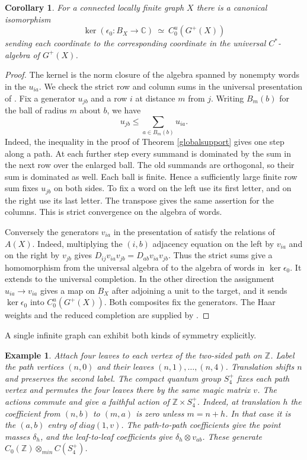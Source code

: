 \documentclass[11pt,a4paper]{article}
\newtheorem{cor}[thm]{Corollary}
\newtheorem{ex}[thm]{Example}
\begin{document}
\begin{cor}\label{fullgraph}
For a connected locally finite graph $X$ there is a canonical isomorphism
\[
 \ker(\epsilon_0:B_X\to\mathbb C)\ \simeq\ C_0^u(G^+(X))
\]
sending each coordinate to the corresponding coordinate in the universal $C^*$-algebra of $G^+(X)$.
\end{cor}
\begin{proof}
The kernel is the norm closure of the algebra spanned by nonempty words in the $u_{ia}$. We check the strict row and column sums in the universal presentation of \cite{rv}. Fix a generator $u_{jb}$ and a row $i$ at distance $m$ from $j$. Writing $B_m(b)$ for the ball of radius $m$ about $b$, we have
\[
 u_{jb}\leq \sum_{a\in B_m(b)}u_{ia}.
\]
Indeed, the inequality in the proof of Theorem \ref{globalsupport} gives one step along a path. At each further step every summand is dominated by the sum in the next row over the enlarged ball. The old summands are orthogonal, so their sum is dominated as well. Each ball is finite. Hence a sufficiently large finite row sum fixes $u_{jb}$ on both sides. To fix a word on the left use its first letter, and on the right use its last letter. The transpose gives the same assertion for the columns. This is strict convergence on the algebra of words.

Conversely the generators $v_{ia}$ in the presentation of \cite{rv} satisfy the relations of $A(X)$. Indeed, multiplying the $(i,b)$ adjacency equation on the left by $v_{ia}$ and on the right by $v_{jb}$ gives $D_{ij}v_{ia}v_{jb}=D_{ab}v_{ia}v_{jb}$. Thus the strict sums give a homomorphism from the universal algebra of \cite{rv} to the algebra of words in $\ker\epsilon_0$. It extends to the universal completion. In the other direction the assignment $u_{ia}\to v_{ia}$ gives a map on $B_X$ after adjoining a unit to the target, and it sends $\ker\epsilon_0$ into $C_0^u(G^+(X))$. Both composites fix the generators. The Haar weights and the reduced completion are supplied by \cite{rv}.
\end{proof}

A single infinite graph can exhibit both kinds of symmetry explicitly.

\begin{ex}
Attach four leaves to each vertex of the two-sided path on $\mathbb Z$. Label the path vertices $(n,0)$ and their leaves $(n,1),\ldots,(n,4)$. Translation shifts $n$ and preserves the second label. The compact quantum group $S_4^+$ fixes each path vertex and permutes the four leaves there by the same magic matrix $v$. The actions commute and give a faithful action of $\mathbb Z\times S_4^+$. Indeed, at translation $h$ the coefficient from $(n,b)$ to $(m,a)$ is zero unless $m=n+h$. In that case it is the $(a,b)$ entry of $diag(1,v)$. The path-to-path coefficients give the point masses $\delta_h$, and the leaf-to-leaf coefficients give $\delta_h\otimes v_{ab}$. These generate $C_0(\mathbb Z)\otimes_{min}C(S_4^+)$.
\end{ex}
\end{document}
